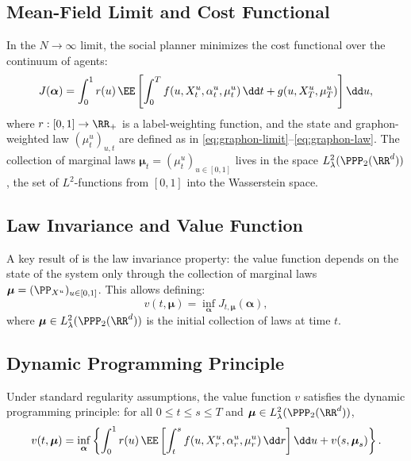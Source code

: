 \documentclass[11pt]{article}
\begin{document}
\subsection{Mean-Field Limit and Cost Functional}

In the $N \to \infty$ limit, the social planner minimizes the cost functional over the continuum of agents:
\begin{equation}\label{eq:nonexch-cost}
  J(\boldsymbol{\alpha}) = \int_0^1 r(u)\,\EE\left[\int_0^T f\!\left(u, X_t^u, \alpha_t^u, \mu_t^u\right)\dd t + g\!\left(u, X_T^u, \mu_T^u\right)\right]\dd u,
\end{equation}
where $r : [0,1] \to \RR_+$ is a label-weighting function, and the state and graphon-weighted law $(\mu_t^u)_{u,t}$ are defined as in \eqref{eq:graphon-limit}--\eqref{eq:graphon-law}. The collection of marginal laws $\boldsymbol{\mu}_t = (\mu_t^u)_{u \in [0,1]}$ lives in the space $L^2_\lambda(\PPP_2(\RR^d))$, the set of $L^2$-functions from $[0,1]$ into the Wasserstein space.

\subsection{Law Invariance and Value Function}

A key result of \citet{decrescenzo2025mfc} is the law invariance property: the value function depends on the state of the system only through the collection of marginal laws $\boldsymbol{\mu} = (\PP_{X^u})_{u \in [0,1]}$. This allows defining:
\begin{equation}\label{eq:nonexch-value}
  v(t, \boldsymbol{\mu}) = \inf_{\boldsymbol{\alpha}} J_{t,\boldsymbol{\mu}}(\boldsymbol{\alpha}),
\end{equation}
where $\boldsymbol{\mu} \in L^2_\lambda(\PPP_2(\RR^d))$ is the initial collection of laws at time $t$.

\subsection{Dynamic Programming Principle}

\begin{theorem}
  Under standard regularity assumptions, the value function $v$ satisfies the dynamic programming principle: for all $0 \le t \le s \le T$ and $\boldsymbol{\mu} \in L^2_\lambda(\PPP_2(\RR^d))$,
  \begin{equation}
    v(t, \boldsymbol{\mu}) = \inf_{\boldsymbol{\alpha}} \left\{ \int_0^1 r(u)\,\EE\left[\int_t^s f\!\left(u, X_r^u, \alpha_r^u, \mu_r^u\right)\dd r\right]\dd u + v(s, \boldsymbol{\mu}_s) \right\}.
  \end{equation}
\end{theorem}
\end{document}
